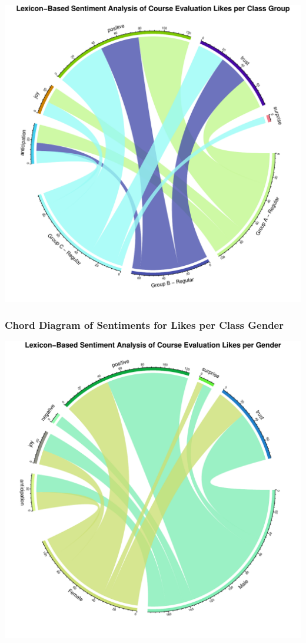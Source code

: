 \documentclass[
]{article}
\begin{document}
\includegraphics{Mid-SemesterCourseEvaluation-20240819-20241125-ADB-BBIT2.2_files/figure-latex/ChordDiagramLikesPerGroup-1.pdf}

\newpage

\subsubsection{Chord Diagram of Sentiments for Likes per Class
Gender}\label{chord-diagram-of-sentiments-for-likes-per-class-gender}

\includegraphics{Mid-SemesterCourseEvaluation-20240819-20241125-ADB-BBIT2.2_files/figure-latex/ChordDiagramLikesPerGender-1.pdf}
\end{document}
